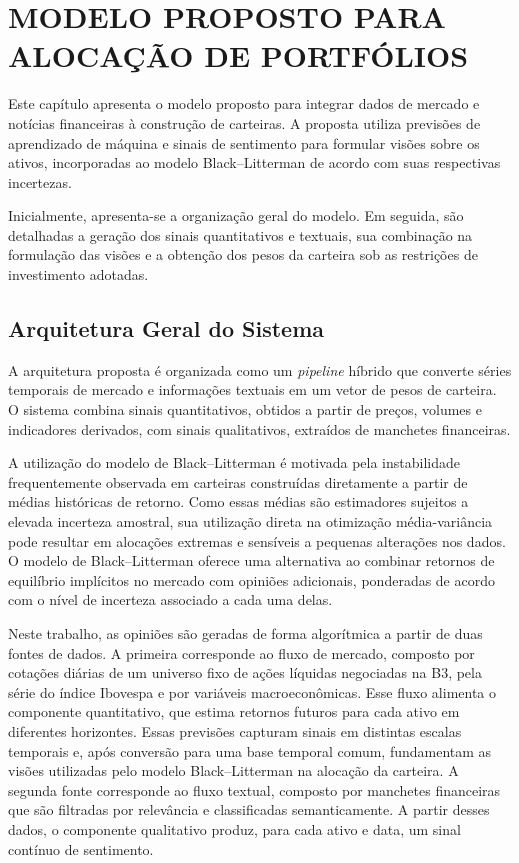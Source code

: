 \chapter{MODELO PROPOSTO PARA ALOCAÇÃO DE PORTFÓLIOS}
\label{chapter:arquitetura}

Este capítulo apresenta o modelo proposto para integrar dados
de mercado e notícias financeiras à construção de carteiras.
A proposta utiliza previsões de aprendizado de máquina e sinais
de sentimento para formular visões sobre os ativos, incorporadas
ao modelo Black--Litterman de acordo com suas respectivas
incertezas.

Inicialmente, apresenta-se a organização geral do modelo.
Em seguida, são detalhadas a geração dos sinais quantitativos
e textuais, sua combinação na formulação das visões e a obtenção
dos pesos da carteira sob as restrições de investimento adotadas.

\section{Arquitetura Geral do Sistema}
\label{sec:arquitetura_geral}

A arquitetura proposta é organizada como um \textit{pipeline} híbrido que converte séries temporais de mercado e informações textuais em um vetor de pesos de carteira. O sistema combina sinais quantitativos, obtidos a partir de preços, volumes e indicadores derivados, com sinais qualitativos, extraídos de manchetes financeiras.

A utilização do modelo de Black--Litterman é motivada pela instabilidade frequentemente observada em carteiras construídas diretamente a partir de médias históricas de retorno. Como essas médias são estimadores sujeitos a elevada incerteza amostral, sua utilização direta na otimização média-variância pode resultar em alocações extremas e sensíveis a pequenas alterações nos dados. O modelo de Black--Litterman oferece uma alternativa ao combinar retornos de equilíbrio implícitos no mercado com opiniões adicionais, ponderadas de acordo com o nível de incerteza associado a cada uma delas.

Neste trabalho, as opiniões são geradas de forma algorítmica a partir de duas fontes de dados. A primeira corresponde ao fluxo de mercado, composto por cotações diárias de um universo fixo de ações líquidas negociadas na B3, pela série do índice Ibovespa e por variáveis macroeconômicas. Esse fluxo alimenta o componente quantitativo, que estima retornos
futuros para cada ativo em diferentes horizontes. Essas previsões
capturam sinais em distintas escalas temporais e, após conversão
para uma base temporal comum, fundamentam as visões utilizadas
pelo modelo Black--Litterman na alocação da carteira. A segunda fonte corresponde ao fluxo textual, composto por manchetes financeiras que são filtradas por relevância e classificadas semanticamente. A partir desses dados, o componente qualitativo produz, para cada ativo e data, um sinal contínuo de sentimento.

